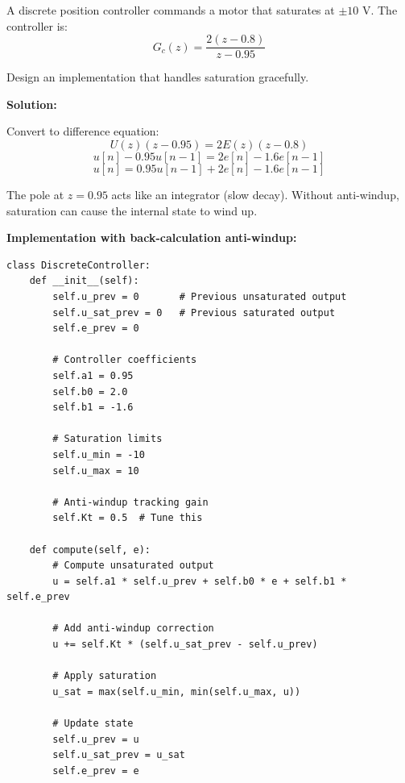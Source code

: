 \begin{example}
\label{ex:saturation}

A discrete position controller commands a motor that saturates at $\pm 10$ V. The controller is:
\begin{equation}
G_c(z) = \frac{2(z - 0.8)}{z - 0.95}
\end{equation}

Design an implementation that handles saturation gracefully.

\textbf{Solution:}

Convert to difference equation:
\begin{equation}
U(z)(z - 0.95) = 2E(z)(z - 0.8)
\end{equation}
\begin{equation}
u[n] - 0.95 u[n-1] = 2e[n] - 1.6e[n-1]
\end{equation}
\begin{equation}
u[n] = 0.95 u[n-1] + 2e[n] - 1.6e[n-1]
\end{equation}

The pole at $z = 0.95$ acts like an integrator (slow decay). Without anti-windup, saturation can cause the internal state to wind up.

\textbf{Implementation with back-calculation anti-windup:}

\begin{verbatim}
class DiscreteController:
    def __init__(self):
        self.u_prev = 0       # Previous unsaturated output
        self.u_sat_prev = 0   # Previous saturated output
        self.e_prev = 0

        # Controller coefficients
        self.a1 = 0.95
        self.b0 = 2.0
        self.b1 = -1.6

        # Saturation limits
        self.u_min = -10
        self.u_max = 10

        # Anti-windup tracking gain
        self.Kt = 0.5  # Tune this

    def compute(self, e):
        # Compute unsaturated output
        u = self.a1 * self.u_prev + self.b0 * e + self.b1 * self.e_prev

        # Add anti-windup correction
        u += self.Kt * (self.u_sat_prev - self.u_prev)

        # Apply saturation
        u_sat = max(self.u_min, min(self.u_max, u))

        # Update state
        self.u_prev = u
        self.u_sat_prev = u_sat
        self.e_prev = e


\end{verbatim}
\end{example}
